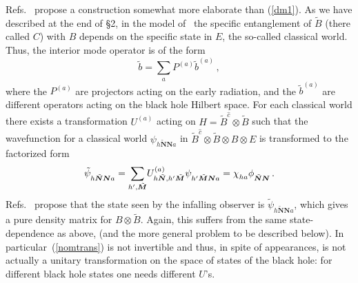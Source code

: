 \documentclass[12pt]{article}
\newcommand{\be}{\begin{equation}}
\newcommand{\ee}{\end{equation}}
\begin{document}
Refs.~\cite{Nomura:2012sw,Nomura3} propose a construction somewhat more elaborate than (\ref{dm1}).  As we have described at the end of \S2, in the model of~\cite{Nomura3} the specific entanglement of $\tilde B$ (there called $C$) with $B$ depends on the specific state in $E$, the so-called classical world.  Thus, the interior mode operator is of the form
\be
\tilde b = \sum_a P^{(a)} \tilde b^{(a)} \,,
\ee
where the $P^{(a)}$ are projectors acting on the early radiation, and the $\tilde b^{(a)}$ are different operators acting on the black hole Hilbert space.  For each classical world there exists a  transformation $U^{(a)}$ acting on $H = \tilde B^{\hat c} \otimes \tilde B$ such that the wavefunction for a classical world $\psi_{h \tilde{\bm N} {\bm N} a}$ in $\tilde B^{\hat c} \otimes \tilde B\otimes B \otimes E$ is transformed to the factorized form
\be
\tilde \psi_{h \tilde{\bm N} {\bm N} a}^{\vphantom{(a)}} = {\sum_{ h' , \tilde{\bm M}}} U^{(a)}_{h \tilde{\bm N},h' \tilde{\bm M}} \psi_{h' \tilde{\bm M} {\bm N} a}^{\vphantom{(a)}}  = \chi_{ha}^{\vphantom{(a)}}  \phi_{ \tilde{\bm N} {\bm N} }^{\vphantom{(a)}}  \, .  \label{nomtrans}
\ee
Refs.~\cite{Nomura:2012sw,Nomura3} propose that the state seen by the infalling observer is $\tilde \psi_{h \tilde{\bm N} {\bm N} a}$, which gives a pure density matrix for $B\otimes \tilde B$.
Again, this suffers from the same state-dependence as above, (and the more general problem to be described below).  {In particular~(\ref{nomtrans}) is not invertible and thus, in spite of appearances, is not actually a unitary} transformation on the space of states of the black hole:  for different black hole states one needs different $U$'s.



\end{document}
